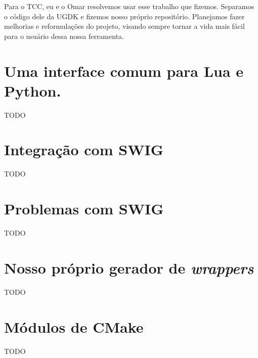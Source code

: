 Para o TCC, eu e o Omar resolvemos usar esse trabalho que fizemos. Separamos o
código dele da UGDK e fizemos nosso próprio repositório. Planejamos fazer
melhorias e reformulações do projeto, visando sempre tornar a vida mais fácil
para o usuário dessa nossa ferramenta.

%

\section{Uma interface comum para Lua e Python.}
\label{sec:atividades:opa}

TODO

\section{Integração com SWIG}

TODO

\section{Problemas com SWIG}

TODO

\section{Nosso próprio gerador de \emph{wrappers}}

TODO

\section{Módulos de CMake}

TODO
